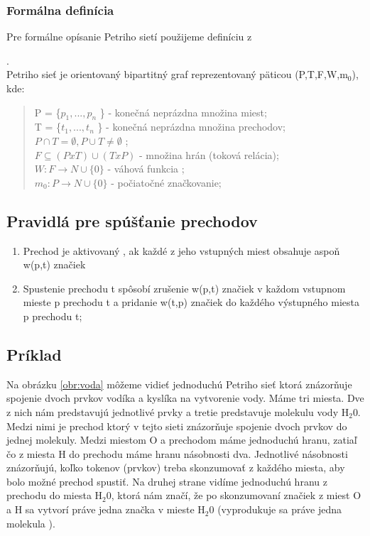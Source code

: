 \subsubsection*{Formálna definícia}
Pre formálne opísanie Petriho sietí použijeme definíciu z \cite{Modelovacie_formalizmy}

.\\
Petriho sieť je orientovaný bipartitný graf reprezentovaný päticou (P,T,F,W,m$_{0}$), kde:\\
\begin{quotation}
	\noindent P = \{$ p_{1}, ... ,p_{n}$ \} - konečná neprázdna množina miest;\\
	T = \{$ t_{1}, ... ,t_{n}$ \} - konečná neprázdna množina prechodov;\\
	{$ P \cap T = \emptyset,P \cup T \neq \emptyset $ }; \\
	{$ F\subseteq ( P x T ) \cup (T x P)$}  - množina hrán (toková relácia);\\
	{$ W : F \rightarrow N \cup \{ 0\}$} - váhová funkcia ;\\
	{$ m_{0} : P \rightarrow N \cup \{ 0\}$} - počiatočné značkovanie;\\
\end{quotation}

\subsection{Pravidlá pre spúšťanie prechodov}
\begin{enumerate}
	\item Prechod je aktivovaný , ak každé z jeho vstupných miest obsahuje aspoň w(p,t) značiek
	\item Spustenie prechodu t spôsobí zrušenie w(p,t) značiek v každom vstupnom mieste p prechodu t a pridanie w(t,p) značiek do každého výstupného miesta p prechodu t;	
\end{enumerate}


\subsection{Príklad}
Na obrázku \ref{obr:voda} môžeme vidieť jednoduchú Petriho sieť ktorá znázorňuje spojenie dvoch prvkov vodíka a kyslíka na vytvorenie vody. Máme tri miesta. Dve z nich nám predstavujú jednotlivé prvky a tretie predstavuje molekulu vody H$_{2} $0. Medzi nimi je prechod ktorý v tejto sieti znázorňuje spojenie dvoch prvkov do jednej molekuly. Medzi miestom O a prechodom máme jednoduchú hranu, zatiaľ čo z miesta H do prechodu máme hranu násobnosti dva. Jednotlivé násobnosti znázorňujú, koľko tokenov (prvkov) treba skonzumovať z každého miesta, aby bolo možné prechod spustiť. Na druhej strane vidíme jednoduchú hranu z prechodu do miesta  H$_{2} $0, ktorá nám značí, že po skonzumovaní značiek z miest O a H sa vytvorí práve jedna značka v mieste H$_{2} $0 (vyprodukuje sa práve jedna molekula ). 

